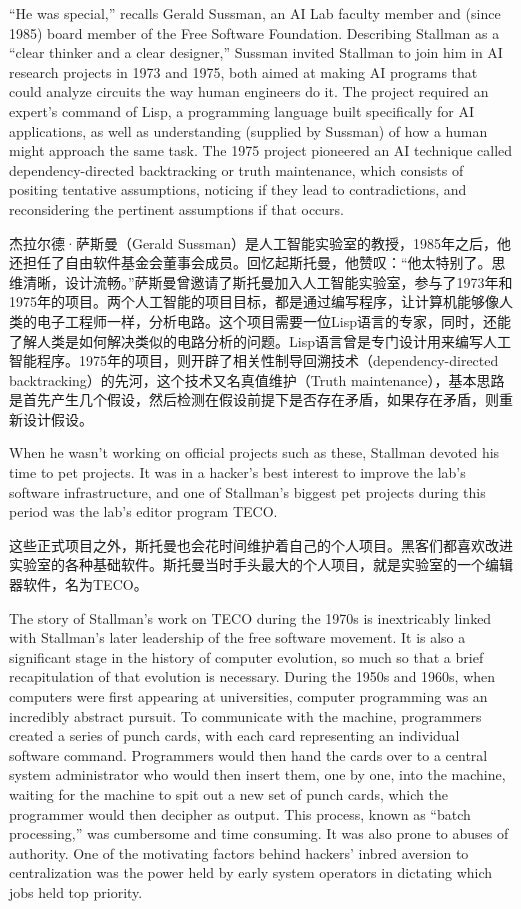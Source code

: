 \ifdefined\eng
``He was special,'' recalls Gerald Sussman, an AI Lab faculty member and (since 1985) board member of the Free Software Foundation. Describing Stallman as a ``clear thinker and a clear designer,'' Sussman invited Stallman to join him in AI research projects in 1973 and 1975, both aimed at making AI programs that could analyze circuits the way human engineers do it. The project required an expert's command of Lisp, a programming language built specifically for AI applications, as well as understanding (supplied by Sussman) of how a human might approach the same task.  The 1975 project pioneered an AI technique called dependency-directed backtracking or truth maintenance, which consists of positing tentative assumptions, noticing if they lead to contradictions, and reconsidering the pertinent assumptions if that occurs.
\fi

\ifdefined\chs
杰拉尔德·萨斯曼（Gerald Sussman）是人工智能实验室的教授，1985年之后，他还担任了自由软件基金会董事会成员。回忆起斯托曼，他赞叹：``他太特别了。思维清晰，设计流畅。''萨斯曼曾邀请了斯托曼加入人工智能实验室，参与了1973年和1975年的项目。两个人工智能的项目目标，都是通过编写程序，让计算机能够像人类的电子工程师一样，分析电路。这个项目需要一位Lisp语言的专家，同时，还能了解人类是如何解决类似的电路分析的问题。Lisp语言曾是专门设计用来编写人工智能程序。1975年的项目，则开辟了相关性制导回溯技术（dependency-directed backtracking）的先河，这个技术又名真值维护（Truth maintenance），基本思路是首先产生几个假设，然后检测在假设前提下是否存在矛盾，如果存在矛盾，则重新设计假设。
\fi

\ifdefined\eng
When he wasn't working on official projects such as these, Stallman devoted his time to pet projects. It was in a hacker's best interest to improve the lab's software infrastructure, and one of Stallman's biggest pet projects during this period was the lab's editor program TECO.
\fi

\ifdefined\chs
这些正式项目之外，斯托曼也会花时间维护着自己的个人项目。黑客们都喜欢改进实验室的各种基础软件。斯托曼当时手头最大的个人项目，就是实验室的一个编辑器软件，名为TECO。
\fi

\ifdefined\eng
The story of Stallman's work on TECO during the 1970s is inextricably linked with Stallman's later leadership of the free software movement. It is also a significant stage in the history of computer evolution, so much so that a brief recapitulation of that evolution is necessary. During the 1950s and 1960s, when computers were first appearing at universities, computer programming was an incredibly abstract pursuit. To communicate with the machine, programmers created a series of punch cards, with each card representing an individual software command. Programmers would then hand the cards over to a central system administrator who would then insert them, one by one, into the machine, waiting for the machine to spit out a new set of punch cards, which the programmer would then decipher as output. This process, known as ``batch processing,'' was cumbersome and time consuming. It was also prone to abuses of authority. One of the motivating factors behind hackers' inbred aversion to centralization was the power held by early system operators in dictating which jobs held top priority.
\fi

